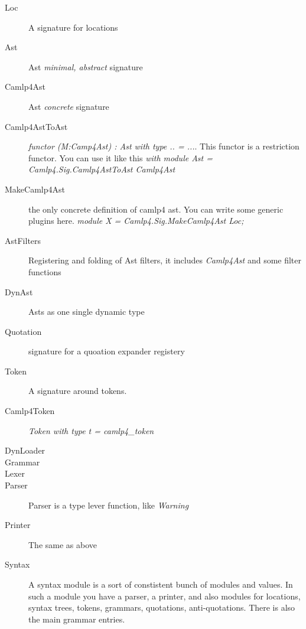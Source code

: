 \begin{description}
\item[Loc] A signature for locations

\item[Ast] Ast \textit{minimal, abstract} signature

\item[Camlp4Ast] Ast \textit{concrete} signature

\item[Camlp4AstToAst]
  \textit{functor (M:Camp4Ast) : Ast with  type .. = ...}. This
  functor is a restriction functor. You can use it like this
  \textit{with module Ast = Camlp4.Sig.Camlp4AstToAst Camlp4Ast}

\item[MakeCamlp4Ast] the only concrete definition of camlp4 ast. You
  can write some generic plugins here.
  \textit{module X = Camlp4.Sig.MakeCamlp4Ast Loc;}
  
\item[AstFilters] Registering and folding of Ast filters, it includes
  \textit{Camlp4Ast} and some filter functions

\item[DynAst] Asts as one single dynamic type

\item[Quotation] signature for a quoation expander registery

\item[Token] A signature around tokens.

\item[Camlp4Token] \textit{Token with type t = camlp4\_token}

\item[DynLoader]

\item[Grammar]

\item[Lexer]

\item[Parser] Parser is a type lever function, like \textit{Warning}

\item[Printer] The same as above

\item[Syntax] A syntax module is a sort of constistent bunch of
  modules and values.  In such a module you have a parser, a printer,
  and also modules for locations, syntax trees, tokens, grammars,
  quotations, anti-quotations.  There is also the main grammar
  entries.


\end{description}
